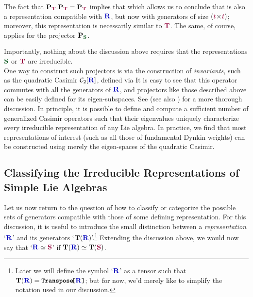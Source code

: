 \documentclass[12pt,a4paper]{article}\let\ifpdf\relax
\begin{document}
The fact that $\mathbf{P}_{\mathbf{\r{T}}}.\mathbf{P}_{\mathbf{\r{T}}}=\mathbf{P}_{\mathbf{\r{T}}}$ implies that 
%
%
which allows us to conclude that 
%
%
is also a representation compatible with $\mathbf{\b{R}}$, but now with generators of size $(\r{t}\!\times\!\r{t})$; moreover, this representation is necessarily similar to $\mathbf{\r{T}}$. The same, of course, applies for the projector $\mathbf{P}_{\mathbf{\g{S}}}$.%

Importantly, nothing about the discussion above requires that the representations $\mathbf{\g{S}}$ or $\mathbf{\r{T}}$ are irreducible.\\[-10pt]

One way to construct such projectors is via the construction of \emph{invariants}, such as the quadratic Casimir $\mathcal{C}_2[\mathbf{\b{R}}]$, defined via
%
%
It is easy to see that this operator commutes with all the generators of $\mathbf{\b{R}}$, and projectors like those described above can be easily defined for its eigen-subspaces. See \cite{birdtracks} (see also \cite{Bourjaily:2025hvq}) for a more thorough discussion. In principle, it is possible to define and compute a sufficient number of generalized Casimir operators such that their eigenvalues uniquely characterize every irreducible representation of any Lie algebra. In practice, we find that most representations of interest (such as all those of fundamental Dynkin weights) can be constructed using merely the eigen-spaces of the quadratic Casimir. 



\newpage
\subsection{Classifying the Irreducible Representations of Simple Lie Algebras}\label{classification_of_irreps}\vspace{-4pt}

Let us now return to the question of how to classify or categorize the possible sets of generators compatible with those of some defining representation. For this discussion, it is useful to introduce the small distinction between a \emph{representation} `$\mathbf{\b{R}}$' and its generators `$\mathbf{T}(\mathbf{\b{R}})$'.\footnote{Later we will define the symbol `$\mathbf{\b{R}}$' as a tensor such that $\mathbf{T}(\mathbf{\b{R}})=\built{Transpose}\brace{\mathbf{\b{R}}}$; but for now, we'd merely like to simplify the notation used in our discussion.} Extending the discussion above, we would now say that `$\mathbf{\b{R}}\simeq\mathbf{\r{S}}$' if $\mathbf{T}(\mathbf{\b{R}})\simeq\mathbf{T}(\mathbf{\r{S}})$. 
\end{document}
